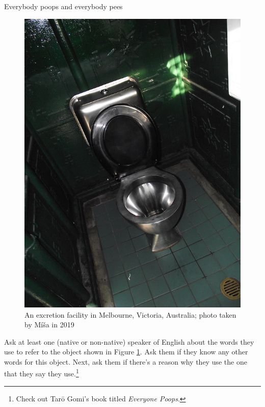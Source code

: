 \begin{exercises}{Everybody poops and everybody pees}
\begin{figure}
    \vspace*{-5mm}
    \includegraphics[width=\textwidth]{chapters/img/toilet.jpg}
    \caption{An excretion facility in Melbourne, Victoria, Australia; photo taken by Míša in 2019}
    \label{fig:extrementation facility}
\end{figure}

Ask at least one (native or non-native) speaker of English about the words they use to refer to the object shown in Figure \ref{fig:extrementation facility}. Ask them if they know any other words for this object. Next, ask them if there's a reason why they use the one that they say they use.\footnote{Check out Tarō Gomi's book titled \textit{Everyone Poops}.}
\vspace*{4.5cm}~
\end{exercises}

